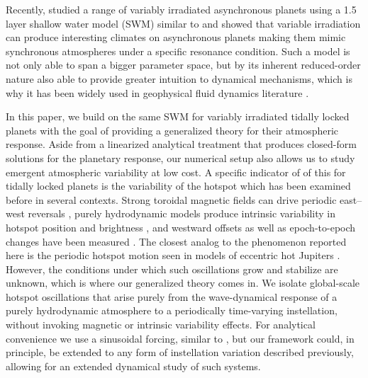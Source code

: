 \documentclass[trackchanges,twocolumn]{aastex7}
\begin{document}
Recently, \cite{Banik2025} studied a range of variably irradiated asynchronous planets using a 1.5 layer shallow water model (SWM) similar to \cite{perez2013atmospheric} and showed that variable irradiation can produce interesting climates on asynchronous planets making them mimic synchronous atmospheres under a specific resonance condition. Such a model is not only able to span a bigger parameter space, but by its inherent reduced-order nature also able to provide greater intuition to dynamical mechanisms, which is why it has been widely used in geophysical fluid dynamics literature \citep{Matsuno1966,philander1984unstable, penn2017thermal,ohno2019atmospheres}. 

In this paper, we build on the same SWM for variably irradiated tidally locked planets with the goal of providing a generalized theory for their atmospheric response. Aside from a linearized analytical treatment that produces closed-form solutions for the planetary response, our numerical setup also allows us to study emergent atmospheric variability at low cost. A specific indicator of of this for tidally locked planets is the variability of the hotspot which has been examined before in several contexts. Strong toroidal magnetic fields can drive periodic east--west reversals \citep{RogersShowman2014,Hindle2019,Hindle2021a}, purely hydrodynamic models produce intrinsic variability in hotspot position and brightness \citep{Cho2003,KomacekShowman2020}, and westward offsets as well as epoch-to-epoch changes have been measured \citep{Dang2018,Armstrong2016}. The closest analog to the phenomenon reported here is the periodic hotspot motion seen in models of eccentric hot Jupiters \citep{Kataria2013,Lewis2014}. However, the conditions under which such oscillations grow and stabilize are unknown, which is where our generalized theory comes in. We isolate global-scale hotspot oscillations that arise purely from the wave-dynamical response of a purely hydrodynamic atmosphere to a periodically time-varying instellation, without invoking magnetic or intrinsic variability effects. For analytical convenience we use a sinusoidal forcing, similar to \cite{Banik2025}, but our framework could, in principle, be extended to any form of instellation variation described previously, allowing for an extended dynamical study of such systems.

\end{document}
